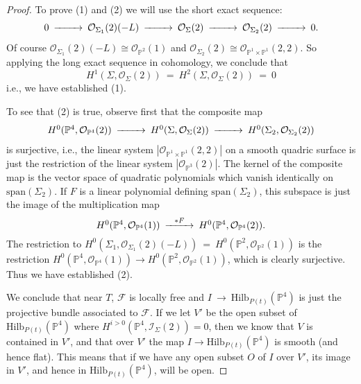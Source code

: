 \documentclass[twoside,12pt,reqno]{amsart}
\theoremstyle{plain}
\theoremstyle{definition}
\newcommand{\PP}{\mathbb{P}}
\def\ps{\vspace{4pt}}
\newcommand{\OO}{\mathcal O}
\begin{document}
\begin{proof}
\ps

To prove (1) and (2) we will use the short exact sequence:
\begin{equation}\begin{CD}
0 @>>> \OO_{\Sigma_1}(2)(-L) @>>> \OO_{\Sigma}(2) @>>>
\OO_{\Sigma_2}(2) @>>> 0.
\end{CD}\end{equation}
Of course $\OO_{\Sigma_1}(2)(-L)\cong \OO_{\PP^2}(1)$ and
$\OO_{\Sigma_2}(2) \cong \OO_{\PP^1\times\PP^1}(2,2)$.  So applying the
long exact sequence in cohomology, we conclude that 
\begin{equation}H^1(\Sigma,\OO_{\Sigma}(2)) ~=~ H^2(\Sigma,\OO_{\Sigma}(2)) ~=~ 0\end{equation}
i.e., we have established (1).

\ps

To see that (2) is true, observe first that the composite map 
\begin{equation}\begin{CD} H^0(\PP^4,\OO_{\PP^4}(2)) @>>>
H^0(\Sigma,\OO_{\Sigma}(2)) @>>>
H^0(\Sigma_2,\OO_{\Sigma_2}(2))\end{CD}\end{equation} 
is surjective, i.e., the linear system $|\OO_{\PP^1\times\PP^1}(2,2)|$
on a smooth quadric surface is just the restriction of the linear
system $|\OO_{\PP^3}(2)|$.  The kernel of the composite map is
the vector space of quadratic polynomials which vanish identically on
$\text{span}(\Sigma_2)$.  If $F$ is a linear polynomial defining
$\text{span}(\Sigma_2)$, this subspace is just the image of the
multiplication map 
\begin{equation}\begin{CD} H^0(\PP^4,\OO_{\PP^4}(1)) @> *F >>
H^0(\PP^4,\OO_{\PP^4}(2)).
\end{CD}\end{equation}
The restriction to $H^0(\Sigma_1,\OO_{\Sigma_1}(2)(-L)) ~=~
H^0(\PP^2,\OO_{\PP^2}(1))$ is the restriction
$H^0(\PP^4,\OO_{\PP^4}(1))  \rightarrow  H^0(\PP^2,\OO_{\PP^2}(1))$,
which is clearly surjective.  Thus we have established (2).

\ps

We conclude that near $T$, $\mathcal{F}$ is locally free and
$I~\rightarrow~ \text{Hilb}_{P(t)}(\PP^4)$ is just the projective bundle
associated to $\mathcal{F}$.  If we let $V'$ be the open subset of 
$\text{Hilb}_{P(t)}(\PP^4)$ where 
$H^{i>0}(\PP^4,\mathcal{I}_{\Sigma}(2)) = 0$, then we know that $V$ is 
contained in $V'$, and that over $V'$ the map $I\rightarrow
\text{Hilb}_{P(t)}(\PP^4)$ is smooth (and hence flat).  This means that if
we have any open subset $O$ of $I$ over $V'$, its image in $V'$, and hence in
$\text{Hilb}_{P(t)}(\PP^4)$, will be open.


\end{proof}
\end{document}
